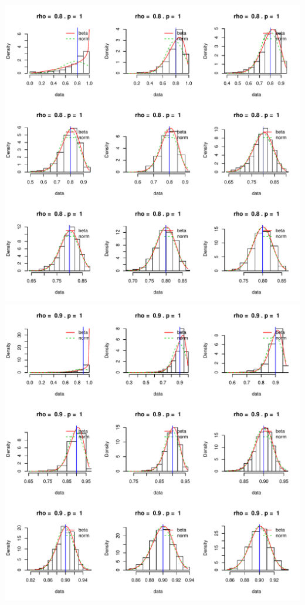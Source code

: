 \documentclass[]{article}
\begin{document}
\includegraphics{2016_w09_files/figure-latex/unnamed-chunk-13-9.pdf}
\includegraphics{2016_w09_files/figure-latex/unnamed-chunk-13-10.pdf}
\end{document}
